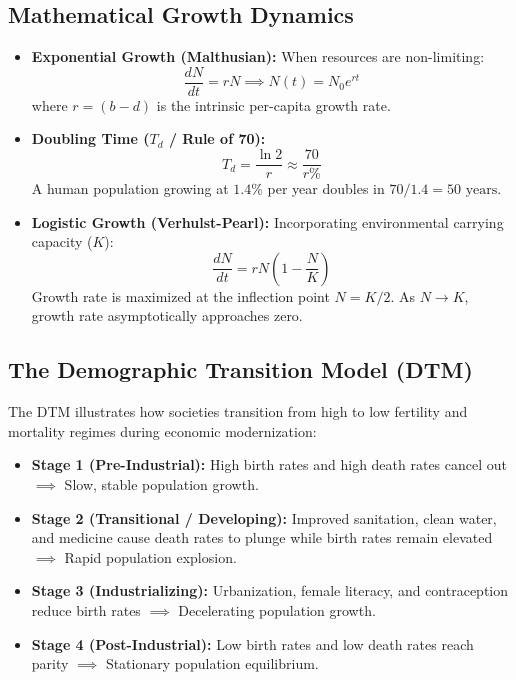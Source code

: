 \subsection{Mathematical Growth Dynamics}
\begin{keyequation}
\begin{itemize}[leftmargin=1.2em]
    \item \textbf{Exponential Growth (Malthusian):} When resources are non-limiting:
    \begin{equation}
    \frac{dN}{dt} = rN \implies N(t) = N_0 e^{rt}
    \end{equation}
    where $r = (b - d)$ is the intrinsic per-capita growth rate.
    \item \textbf{Doubling Time ($T_d$ / Rule of 70):}
    \begin{equation}
    T_d = \frac{\ln 2}{r} \approx \frac{70}{r\%}
    \end{equation}
    A human population growing at $1.4\%$ per year doubles in $70 / 1.4 = 50\text{ years}$.
    \item \textbf{Logistic Growth (Verhulst-Pearl):} Incorporating environmental carrying capacity ($K$):
    \begin{equation}
    \frac{dN}{dt} = rN \left(1 - \frac{N}{K}\right)
    \end{equation}
    Growth rate is maximized at the inflection point $N = K/2$. As $N \to K$, growth rate asymptotically approaches zero.
\end{itemize}
\end{keyequation}

\subsection{The Demographic Transition Model (DTM)}
The DTM illustrates how societies transition from high to low fertility and mortality regimes during economic modernization:
\begin{itemize}[leftmargin=1.5em]
    \item \textbf{Stage 1 (Pre-Industrial):} High birth rates and high death rates cancel out $\implies$ Slow, stable population growth.
    \item \textbf{Stage 2 (Transitional / Developing):} Improved sanitation, clean water, and medicine cause death rates to plunge while birth rates remain elevated $\implies$ Rapid population explosion.
    \item \textbf{Stage 3 (Industrializing):} Urbanization, female literacy, and contraception reduce birth rates $\implies$ Decelerating population growth.
    \item \textbf{Stage 4 (Post-Industrial):} Low birth rates and low death rates reach parity $\implies$ Stationary population equilibrium.
\end{itemize}

